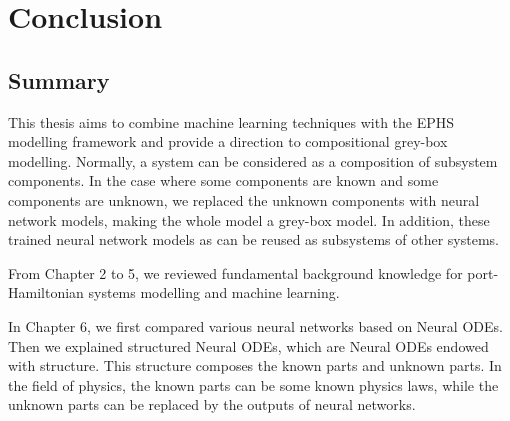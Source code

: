 \documentclass[
	parskip, 			   %
	twoside, 			   %
	DIV=14, 			   %
	BCOR=15.0mm, 		   %
	headsepline, 		   %
	open=right, 		   %
	captions=tableheading, %
	bibliography=totoc,    %
	numbers=noenddot       %
]{scrreprt}
\begin{document}
\begin{figure}[h!]
    \label{fig:ndho_experiment_with_EPHS_structure_reuse}
\end{figure}

\clearpage
\chapter{Conclusion}
\label{ch:chapter8}
\section{Summary}
This thesis aims to combine machine learning techniques with the EPHS modelling framework and provide a direction to compositional grey-box modelling. Normally, a system can be considered as a composition of subsystem components. In the case where some components are known and some components are unknown, we replaced the unknown components with neural network models, making the whole model a grey-box model. In addition, these trained neural network models as can be reused as subsystems of other systems.

From Chapter 2 to 5, we reviewed fundamental background knowledge for port-Hamiltonian systems modelling and machine learning. 

In Chapter 6, we first compared various neural networks based on Neural ODEs. Then we explained structured Neural ODEs, which are Neural ODEs endowed with structure. This structure composes the known parts and unknown parts. In the field of physics, the known parts can be some known physics laws, while the unknown parts can be replaced by the outputs of neural networks.
\end{document}
